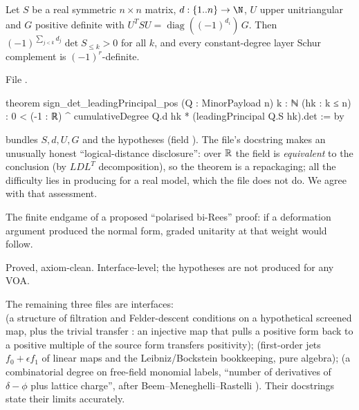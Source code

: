 \begin{theorem}\label{l19:thm:payload}
Let $S$ be a real symmetric $n\times n$ matrix, $d:\{1..n\}\to\N$, $U$ upper unitriangular and $G$ positive
definite with $U^TSU = \operatorname{diag}((-1)^{d_i})\,G$. Then $(-1)^{\sum_{j<k}d_j}\det S_{\le k}>0$ for all
$k$, and every constant-degree layer Schur complement is $(-1)^r$-definite.
\end{theorem}

\noindent File .
\begin{leancode}
theorem sign_det_leadingPrincipal_pos (Q : MinorPayload n) {k : ℕ}
    (hk : k ≤ n) :
    0 < (-1 : ℝ) ^ cumulativeDegree Q.d hk
        * (leadingPrincipal Q.S hk).det := by
\end{leancode}

\begin{dictionary}
 bundles $S,d,U,G$ and the hypotheses (field ).
The file's docstring makes an unusually honest ``logical-distance disclosure'': over $\mathbb{R}$ the field
 is \emph{equivalent} to the conclusion (by $LDL^T$ decomposition), so the theorem is a
repackaging; all the difficulty lies in producing  for a real model, which the file does not do.
We agree with that assessment.
\end{dictionary}

\begin{physics}
The finite endgame of a proposed ``polarised bi-Rees'' proof: if a deformation argument produced the normal
form, graded unitarity at that weight would follow.
\end{physics}

\begin{status}
Proved, axiom-clean. Interface-level; the hypotheses are not produced for any VOA.
\end{status}

The remaining three files are interfaces:\\  (a structure
 of filtration and Felder-descent conditions on a hypothetical screened map,
plus the trivial transfer : an injective map that pulls a positive form back
to a positive multiple of the source form transfers positivity); 
(first-order jets $f_0+\epsilon f_1$ of linear maps and the Leibniz/Bockstein bookkeeping, pure algebra);
 (a combinatorial degree  on free-field monomial labels,
``number of derivatives of $\delta-\phi$ plus lattice charge'', after Beem--Meneghelli--Rastelli%
). Their docstrings state their limits accurately.

